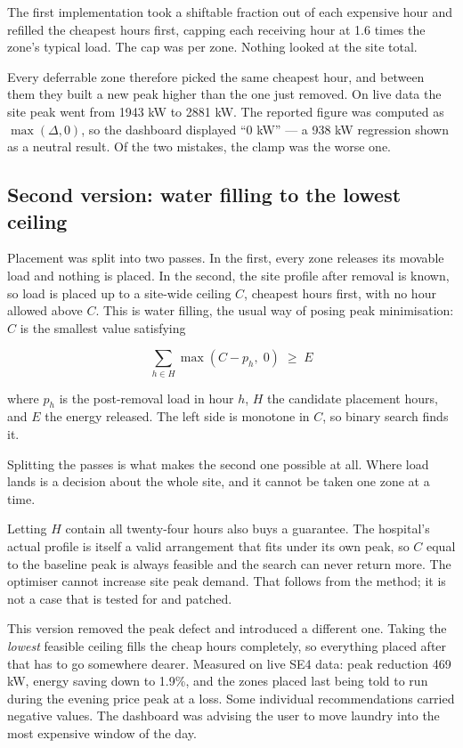 \documentclass[conference]{IEEEtran}
\begin{document}
The first implementation took a shiftable fraction out of each expensive hour
and refilled the cheapest hours first, capping each receiving hour at 1.6 times
the zone's typical load. The cap was per zone. Nothing looked at the site
total.

Every deferrable zone therefore picked the same cheapest hour, and between them
they built a new peak higher than the one just removed. On live data the site
peak went from 1943 kW to 2881 kW. The reported figure was computed as
$\max(\Delta,0)$, so the dashboard displayed ``0 kW'' --- a 938 kW regression
shown as a neutral result. Of the two mistakes, the clamp was the worse one.

\subsection{Second version: water filling to the lowest ceiling}

Placement was split into two passes. In the first, every zone releases its
movable load and nothing is placed. In the second, the site profile after
removal is known, so load is placed up to a site-wide ceiling $C$, cheapest hours
first, with no hour allowed above $C$. This is water filling, the usual way of
posing peak minimisation: $C$ is the smallest value satisfying

\begin{equation}
\sum_{h \in H} \max\!\left(C - p_h,\; 0\right) \;\ge\; E
\label{eq:waterfill}
\end{equation}

where $p_h$ is the post-removal load in hour $h$, $H$ the candidate placement
hours, and $E$ the energy released. The left side is monotone in $C$, so binary
search finds it.

Splitting the passes is what makes the second one possible at all. Where load
lands is a decision about the whole site, and it cannot be taken one zone at a
time.

Letting $H$ contain all twenty-four hours also buys a guarantee. The hospital's
actual profile is itself a valid arrangement that fits under its own peak, so
$C$ equal to the baseline peak is always feasible and the search can never
return more. The optimiser cannot increase site peak demand. That follows from
the method; it is not a case that is tested for and patched.

This version removed the peak defect and introduced a different one. Taking the
\emph{lowest} feasible ceiling fills the cheap hours completely, so everything
placed after that has to go somewhere dearer. Measured on live SE4 data: peak
reduction 469 kW, energy saving down to 1.9\%, and the zones placed last being
told to run during the evening price peak at a loss. Some individual
recommendations carried negative values. The dashboard was advising the user to
move laundry into the most expensive window of the day.
\end{document}
